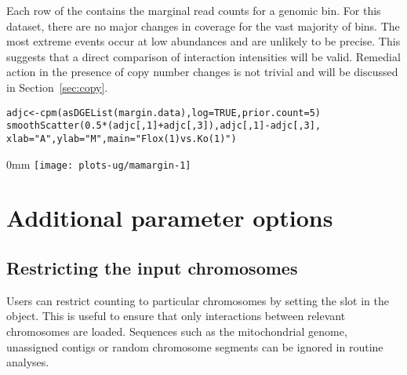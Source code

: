 \documentclass{report}\usepackage[]{graphicx}\usepackage[usenames,dvipsnames]{color}
\makeatletter
\def\maxwidth{ %
  \ifdim\Gin@nat@width>\linewidth
    \linewidth
  \else
    \Gin@nat@width
  \fi
}
\newcommand{\hlnum}[1]{\textcolor[rgb]{0.816,0.125,0.439}{#1}}%
\newcommand{\hlstr}[1]{\textcolor[rgb]{0.251,0.627,0.251}{#1}}%
\newcommand{\hlopt}[1]{\textcolor[rgb]{0,0,0}{#1}}%
\newcommand{\hlstd}[1]{\textcolor[rgb]{0.251,0.251,0.251}{#1}}%
\newcommand{\hlkwb}[1]{\textcolor[rgb]{0,0,0}{#1}}%
\newcommand{\hlkwc}[1]{\textcolor[rgb]{0.251,0.251,0.251}{#1}}%
\newcommand{\hlkwd}[1]{\textcolor[rgb]{0.878,0.439,0.125}{#1}}%
\newenvironment{knitrout}{}{} %
\makeatother
\begin{document}
Each row of the  contains the marginal read counts for a genomic bin.
For this dataset, there are no major changes in coverage for the vast majority of bins.
The most extreme events occur at low abundances and are unlikely to be precise. 
This suggests that a direct comparison of interaction intensities will be valid.
Remedial action in the presence of copy number changes is not trivial and will be discussed in Section~\ref{sec:copy}.

\begin{knitrout}
\color{fgcolor}\begin{kframe}
\begin{alltt}
\hlstd{adjc} \hlkwb{<-} \hlkwd{cpm}\hlstd{(}\hlkwd{asDGEList}\hlstd{(margin.data),} \hlkwc{log}\hlstd{=}\hlnum{TRUE}\hlstd{,} \hlkwc{prior.count}\hlstd{=}\hlnum{5}\hlstd{)}
\hlkwd{smoothScatter}\hlstd{(}\hlnum{0.5}\hlopt{*}\hlstd{(adjc[,}\hlnum{1}\hlstd{]}\hlopt{+}\hlstd{adjc[,}\hlnum{3}\hlstd{]), adjc[,}\hlnum{1}\hlstd{]}\hlopt{-}\hlstd{adjc[,}\hlnum{3}\hlstd{],}
    \hlkwc{xlab}\hlstd{=}\hlstr{"A"}\hlstd{,} \hlkwc{ylab}\hlstd{=}\hlstr{"M"}\hlstd{,} \hlkwc{main}\hlstd{=}\hlstr{"Flox (1) vs. Ko (1)"}\hlstd{)}
\end{alltt}
\end{kframe}\begin{adjustwidth}{\fltoffset}{0mm}
\texttt{[image: plots-ug/mamargin-1]} \end{adjustwidth}
\end{knitrout}

\section{Additional parameter options}

\subsection{Restricting the input chromosomes}
\label{sec:restrictchr}

Users can restrict counting to particular chromosomes by setting the  slot in the  object.
This is useful to ensure that only interactions between relevant chromosomes are loaded.
Sequences such as the mitochondrial genome, unassigned contigs or random chromosome segments can be ignored in routine analyses.
\end{document}

